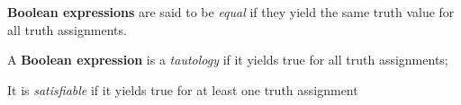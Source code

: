 \documentclass[12pt]{article}
\begin{document}
\begin{landscape}

\centerline{\textbf{Boolean expressions} are said to be \textit{equal} if they yield the same truth value for all truth assignments.} 
\centerline{A \textbf{Boolean expression} is a \textit{tautology} if it yields true for all truth assignments;}
\centerline{It is \textit{satisfiable} if it yields true for at least one truth assignment}


\end{landscape}
\end{document}
